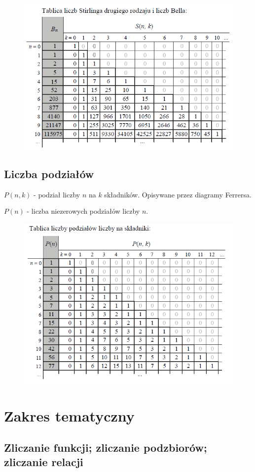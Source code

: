 \documentclass[11pt]{article}
\theoremstyle{definition}
\numberwithin{zadanie}{subsection}
\begin{document}
\begin{figure}[H]
    \centering
    \includegraphics[width=0.7\linewidth]{bell2.png}
\end{figure}

\subsection{Liczba podziałów}

$P(n,k)$ - podział liczby $n$ na $k$ składników. Opisywane przez diagramy Ferrersa.

$P(n)$ - liczba niezerowych podziałów liczby $n$.

\begin{figure}[H]
    \centering
    \includegraphics[width=0.7\linewidth]{podzial.png}
\end{figure}



\section{Zakres tematyczny}

\subsection{Zliczanie funkcji; zliczanie podzbiorów; zliczanie relacji}
\end{document}
